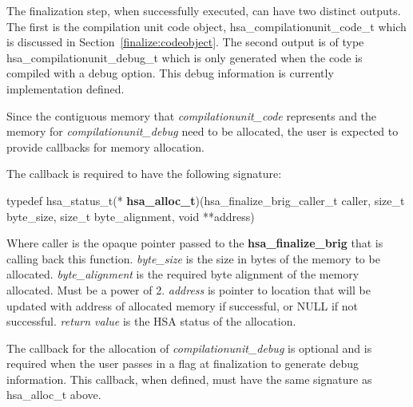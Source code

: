 \documentclass{book}
\newcommand{\hsadef}[2]{\hypertarget{#1}{\textbf{#2}}}
\newcommand{\reffun}[1]{\textbf{#1}}
\newcommand{\reftyp}[1]{#1}
\begin{document}
\begin{appendices}
 
The finalization step, when successfully executed, can have two
distinct outputs. The first is the compilation unit code object,
\reftyp{hsa\_compilationunit\_code\_t} which is discussed in
Section~\ref{finalize:codeobject}. The second output is of type
\reftyp{hsa\_compilationunit\_debug\_t} which is only generated when
the code is  compiled with a debug option. This debug information is
currently implementation defined.

Since the contiguous memory that {\itshape
compilationunit\_code} represents and the memory for {\itshape
compilationunit\_debug} need to be allocated, the user is expected
to provide callbacks for memory allocation.

The callback is required to have the following signature:
\makeatletter{}

\noindent\begin{tcolorbox}[nobeforeafter,arc=0mm,colframe=white,colback=lightgray,left=0mm]
typedef hsa\_status\_t(*  \hsadef{group__TDF__hsa__alloc__t_1ga96fcd66293afa5cd699747298a4010b6}{hsa\_alloc\_t})(hsa\_finalize\_brig\_caller\_t caller, size\_t byte\_size, size\_t byte\_alignment, void **address)
\end{tcolorbox}
 

Where caller is the opaque pointer passed to the
\reffun{hsa\_finalize\_brig} that is calling back this function.
{\itshape byte\_size} is the size in bytes of the memory to be
allocated.  {\itshape byte\_alignment} is the required byte alignment
of the memory allocated. Must be a power of 2.  {\itshape address} is
pointer to location that will be updated with address of allocated
memory if successful, or NULL if not successful.  {\itshape return
  value} is the HSA status of the allocation.

The callback for the allocation of {\itshape compilationunit\_debug}
is optional and is required when the user passes in a flag at
finalization to generate debug information. This callback, when
defined, must have the same signature as \reftyp{hsa\_alloc\_t} above.

\makeatletter{}


\end{appendices}
\end{document}

